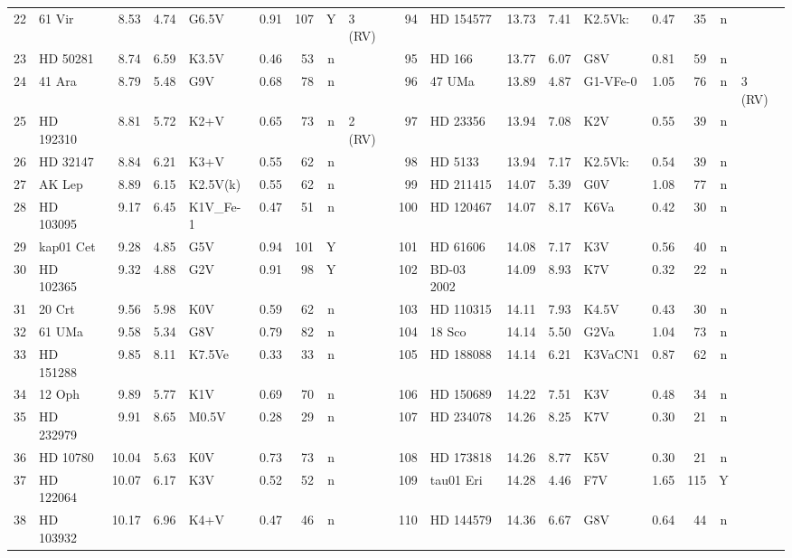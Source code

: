 \begin{landscape}
\begin{longtable}{r l r r l r r c l @{\;\vrule\;} r l r r l r r c l}
22 & 61 Vir & 8.53 & 4.74 & G6.5V & 0.91 & 107 & Y & 3 (RV) & 94 & HD 154577 & 13.73 & 7.41 & K2.5Vk: & 0.47 & 35 & n &  \\
23 & HD 50281 & 8.74 & 6.59 & K3.5V & 0.46 & 53 & n &  & 95 & HD 166 & 13.77 & 6.07 & G8V & 0.81 & 59 & n &  \\
24 & 41 Ara & 8.79 & 5.48 & G9V & 0.68 & 78 & n &  & 96 & 47 UMa & 13.89 & 4.87 & G1-VFe-0 & 1.05 & 76 & n & 3 (RV) \\
25 & HD 192310 & 8.81 & 5.72 & K2+V & 0.65 & 73 & n & 2 (RV) & 97 & HD 23356 & 13.94 & 7.08 & K2V & 0.55 & 39 & n &  \\
26 & HD 32147 & 8.84 & 6.21 & K3+V & 0.55 & 62 & n &  & 98 & HD 5133 & 13.94 & 7.17 & K2.5Vk: & 0.54 & 39 & n &  \\
27 & AK Lep & 8.89 & 6.15 & K2.5V(k) & 0.55 & 62 & n &  & 99 & HD 211415 & 14.07 & 5.39 & G0V & 1.08 & 77 & n &  \\
28 & HD 103095 & 9.17 & 6.45 & K1V\_Fe-1 & 0.47 & 51 & n &  & 100 & HD 120467 & 14.07 & 8.17 & K6Va & 0.42 & 30 & n &  \\
29 & kap01 Cet & 9.28 & 4.85 & G5V & 0.94 & 101 & Y &  & 101 & HD 61606 & 14.08 & 7.17 & K3V & 0.56 & 40 & n &  \\
30 & HD 102365 & 9.32 & 4.88 & G2V & 0.91 & 98 & Y &  & 102 & BD-03 2002 & 14.09 & 8.93 & K7V & 0.32 & 22 & n &  \\
31 & 20 Crt & 9.56 & 5.98 & K0V & 0.59 & 62 & n &  & 103 & HD 110315 & 14.11 & 7.93 & K4.5V & 0.43 & 30 & n &  \\
32 & 61 UMa & 9.58 & 5.34 & G8V & 0.79 & 82 & n &  & 104 & 18 Sco & 14.14 & 5.50 & G2Va & 1.04 & 73 & n &  \\
33 & HD 151288 & 9.85 & 8.11 & K7.5Ve & 0.33 & 33 & n &  & 105 & HD 188088 & 14.14 & 6.21 & K3VaCN1 & 0.87 & 62 & n &  \\
34 & 12 Oph & 9.89 & 5.77 & K1V & 0.69 & 70 & n &  & 106 & HD 150689 & 14.22 & 7.51 & K3V & 0.48 & 34 & n &  \\
35 & HD 232979 & 9.91 & 8.65 & M0.5V & 0.28 & 29 & n &  & 107 & HD 234078 & 14.26 & 8.25 & K7V & 0.30 & 21 & n &  \\
36 & HD 10780 & 10.04 & 5.63 & K0V & 0.73 & 73 & n &  & 108 & HD 173818 & 14.26 & 8.77 & K5V & 0.30 & 21 & n &  \\
37 & HD 122064 & 10.07 & 6.17 & K3V & 0.52 & 52 & n &  & 109 & tau01 Eri & 14.28 & 4.46 & F7V & 1.65 & 115 & Y &  \\
38 & HD 103932 & 10.17 & 6.96 & K4+V & 0.47 & 46 & n &  & 110 & HD 144579 & 14.36 & 6.67 & G8V & 0.64 & 44 & n &  \\

\end{longtable}
\end{landscape}
